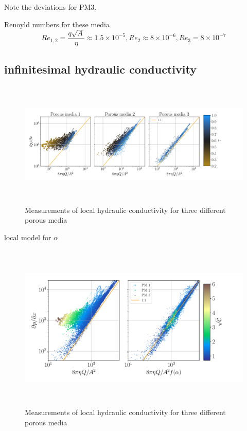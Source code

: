 \documentclass[draft]{agujournal2019}
\begin{document}
Note the deviations for PM3.


Renoyld numbers for these media 
\begin{equation}
	Re_{1,2} = \frac{q \sqrt{A}}{\eta}\approx 1.5 \times 10^{-5}, Re_2 \approx 8 \times 10^{-6}, Re_3 = 8 \times 10^{-7}
\end{equation}

\subsection{infinitesimal hydraulic conductivity}

\begin{figure}\label{fig:local_and_integrated}
\includegraphics[height=6cm]{figures/infi_dpdx_3.pdf}
\caption{Measurements of local hydraulic conductivity for three different porous media}
\end{figure}

local model for $\alpha$

\begin{figure}\label{fig:local_and_integrated}
\includegraphics[height=8cm]{figures/infi_dpdx_combined.pdf}
\caption{Measurements of local hydraulic conductivity for three different porous media}
\end{figure}
\end{document}
